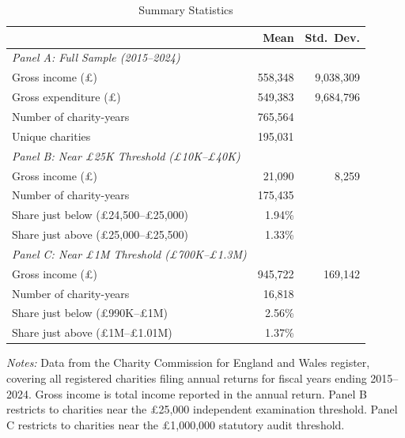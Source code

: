 \begin{table}[htbp]
\centering
\caption{Summary Statistics}
\label{tab:summary}
\begin{tabular}{lrr}
\hline\hline
& Mean & Std.~Dev. \\
\hline
\emph{Panel A: Full Sample (2015--2024)} &  &  \\
Gross income (\pounds) & 558,348 & 9,038,309 \\
Gross expenditure (\pounds) & 549,383 & 9,684,796 \\
Number of charity-years & 765,564 &  \\
Unique charities & 195,031 &  \\
\addlinespace
\emph{Panel B: Near \pounds25K Threshold (\pounds10K--\pounds40K)} &  &  \\
Gross income (\pounds) & 21,090 & 8,259 \\
Number of charity-years & 175,435 &  \\
Share just below (\pounds24,500--\pounds25,000) & 1.94\% &  \\
Share just above (\pounds25,000--\pounds25,500) & 1.33\% &  \\
\addlinespace
\emph{Panel C: Near \pounds1M Threshold (\pounds700K--\pounds1.3M)} &  &  \\
Gross income (\pounds) & 945,722 & 169,142 \\
Number of charity-years & 16,818 &  \\
Share just below (\pounds990K--\pounds1M) & 2.56\% &  \\
Share just above (\pounds1M--\pounds1.01M) & 1.37\% &  \\
\hline\hline
\end{tabular}
\begin{tablenotes}[flushleft]
\small
\item \textit{Notes:} Data from the Charity Commission for England and Wales register, covering all registered charities filing annual returns for fiscal years ending 2015--2024. Gross income is total income reported in the annual return. Panel B restricts to charities near the \pounds25,000 independent examination threshold. Panel C restricts to charities near the \pounds1,000,000 statutory audit threshold.
\end{tablenotes}
\end{table}
